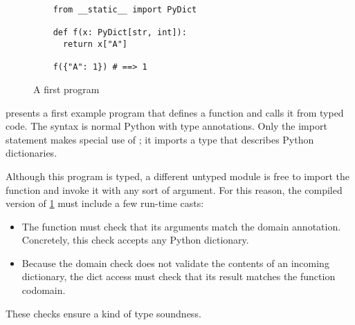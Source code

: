 \documentclass[a4paper,english,cleveref,autoref,thm-restate,anonymous,]{lipics-v2021}
\begin{document}
\begin{figure}
  \begin{verbatim}
    from __static__ import PyDict

    def f(x: PyDict[str, int]):
      return x["A"]

    f({"A": 1}) # ==> 1
  \end{verbatim}
%
%
%
%
  \caption{A first \SP{} program}
  \label{fig:sp-example}
\end{figure}

 presents a first example program
that defines a function  and calls it from typed code.
The syntax is normal Python with type annotations.
Only the import statement makes special use of \SP{};
it imports a type  that describes Python dictionaries.

Although this program is typed, a different untyped module is free
to import the function  and invoke it with any sort of
argument.
For this reason, the compiled version of \cref{fig:sp-example} must
include a few run-time casts:
\begin{itemize}
  \item
    The function  must check that its arguments match the  domain annotation.
    Concretely, this check accepts any Python dictionary.
  \item
    Because the domain check does not validate the contents of an incoming dictionary,
    the dict access must check that its result matches the function codomain.
\end{itemize}
These checks ensure a kind of type soundness.
\end{document}
